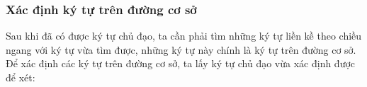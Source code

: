 \documentclass[a4paper,12pt]{article}
\begin{document}
	
	
	
	
	\subsubsection*{Xác định ký tự trên đường cơ sở}
	
	Sau khi đã có được ký tự chủ đạo\cite{zanibbi}, ta cần phải tìm những ký tự liền kề theo chiều ngang với ký tự vừa tìm được, những ký tự này chính là ký tự trên đường cơ sở. Để xác định các ký tự trên đường cơ sở, ta lấy ký tự chủ đạo\cite{zanibbi} vừa xác định được để xét:
	
\end{document}
